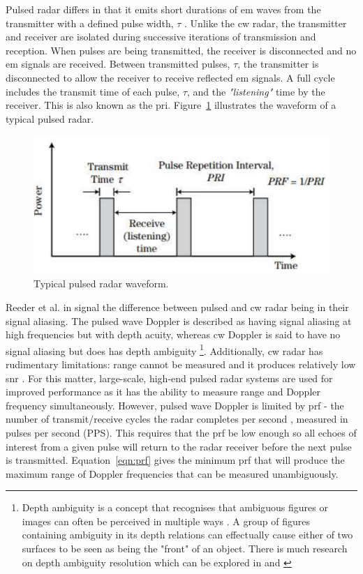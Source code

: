 \documentclass[class=report,11pt,crop=false]{standalone}
\begin{document}
Pulsed \gls{radar} differs in that it emits short durations of \gls{em} waves from the transmitter with a defined pulse width, $\tau$ \cite{pomr}. Unlike the \gls{cw} \gls{radar}, the transmitter and receiver are isolated during successive iterations of transmission and reception. When pulses are being transmitted, the receiver is disconnected and no \gls{em} signals are received. Between transmitted pulses, $\tau$, the transmitter is disconnected to allow the receiver to receive reflected \gls{em} signals. A full cycle includes the transmit time of each pulse, $\tau$, and the \emph{"listening"} time by the receiver. This is also known as the \gls{pri}. Figure~\ref{fig:pulsed} illustrates the waveform of a typical pulsed \gls{radar}.

\begin{figure}[htbp]
    \centering
    \includegraphics[width=0.6\columnwidth]{../Images/pulsed.png}
    \caption{Typical pulsed \gls{radar} waveform. \cite{pomr}}
    \label{fig:pulsed}
\end{figure}

Reeder et al. in \cite{reeder} signal the difference between pulsed and \gls{cw} \gls{radar} being in their signal aliasing. The pulsed wave Doppler is described as having signal aliasing at high frequencies but with depth acuity, whereas \gls{cw} Doppler is said to have no signal aliasing but does has depth ambiguity \footnote{Depth ambiguity is a concept that recognises that ambiguous figures or images can often be perceived in multiple ways \cite{yu}. A group of figures containing ambiguity in its depth relations can effectually cause either of two surfaces to be seen as being the "front" of an object. There is much research on depth ambiguity resolution which can be explored in \cite{helou} and \cite{blackburn}}. Additionally, \gls{cw} \gls{radar} has rudimentary limitations: range cannot be measured and it produces relatively low \gls{snr} \cite{mitlecture2}. For this matter, large-scale, high-end pulsed \gls{radar} systems are used for improved performance as it has the ability to measure range and Doppler frequency simultaneously. However, pulsed wave Doppler is limited by \gls{prf} - the number  of  transmit/receive  cycles  the  radar completes per second \cite{pomr}, measured in pulses per second (PPS). This requires that the \gls{prf} be low enough so all echoes of interest from a given pulse will return to the radar receiver before the next pulse is transmitted. Equation~\ref{eqn:prf} gives the minimum \gls{prf} that will produce the maximum range of Doppler frequencies that can be measured unambiguously.
\end{document}
